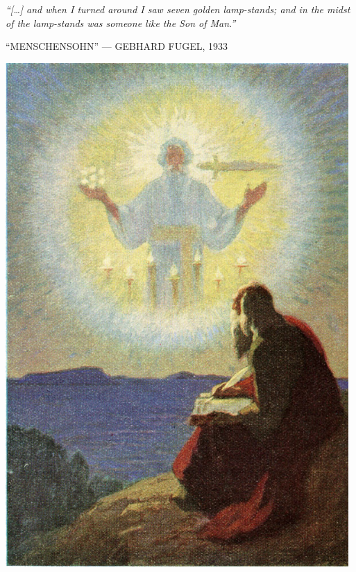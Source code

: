\clearpage
\thispagestyle{empty}
\null\vfill
\settowidth{}
\begin{center}
\parbox{\longest}{%
  \raggedright{\huge\itshape%
    ``[…] and when I turned around I saw seven golden lamp-stands; and in the midst of the lamp-stands was someone like the Son of Man.'' \par\bigskip
  }
  \raggedleft\Large\MakeUppercase{``Menschensohn'' — Gebhard Fugel, 1933}\par%
}
\vfill\vfill
\clearpage\newpage
\end{center}
\newpage
\thispagestyle{empty}
\begin{center}
	\includegraphics[width=0.98\textwidth]{images/illustrations/fugelmenschensohn.jpg}
\end{center}